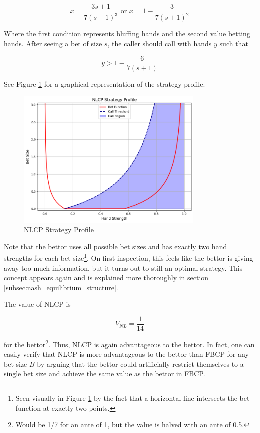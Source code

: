\documentclass[../../main/main.tex]{subfiles}
\begin{document}
$$ x = \frac{3 s+1}{7 (s+1)^3} \text{ or } x = 1 - \frac{3}{7 (s+1)^2} $$

Where the first condition represents bluffing hands and the second value betting hands. After seeing a bet of size $s$, the caller should call with hands $y$ such that

$$ y > 1 - \frac{6}{7 (s+1)} $$

See Figure \ref{fig:nlcp_strategy_profile} for a graphical representation of the strategy profile.

\begin{figure}[h!]
    \centering
    \includegraphics[width=0.8\textwidth]{images/NLCP_strategy_profile.png}
    \caption{NLCP Strategy Profile}
    \label{fig:nlcp_strategy_profile}
\end{figure}

Note that the bettor uses all possible bet sizes and has exactly two hand strengths for each bet size\footnote{Seen visually in Figure \ref{fig:nlcp_strategy_profile} by the fact that a horizontal line intersects the bet function at exactly two points.}. On first inspection, this feels like the bettor is giving away too much information, but it turns out to still an optimal strategy. This concept appears again and is explained more thoroughly in section \ref{subsec:nash_equilibrium_structure}.

The value of NLCP is

$$ V_{NL} = \frac{1}{14} $$

for the bettor\footnote{Would be 1/7 for an ante of 1, but the value is halved with an ante of 0.5.}. Thus, NLCP is again advantageous to the bettor. In fact, one can easily verify that NLCP is more advantageous to the bettor than FBCP for any bet size $B$ by arguing that the bettor could artificially restrict themselves to a single bet size and achieve the same value as the bettor in FBCP.
\end{document}
